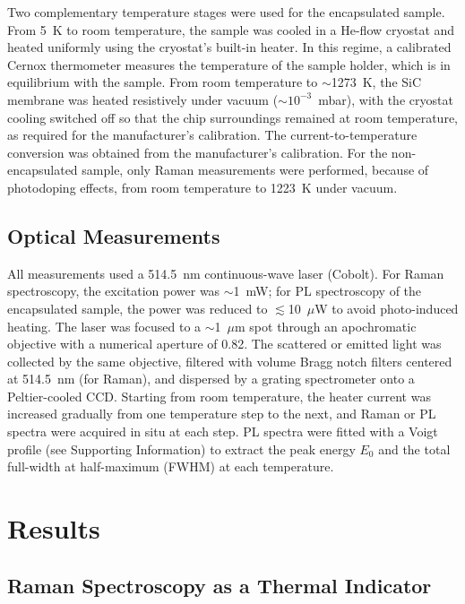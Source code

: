 \documentclass[letterpaper]{article}
\DeclareRobustCommand{\rev}[1]{#1}
\begin{document}
Two complementary temperature stages were used for the encapsulated sample.
From 5~K to room temperature, the sample was cooled in a He-flow cryostat and
heated uniformly using the cryostat's built-in heater. In this regime, \rev{a
calibrated Cernox thermometer measures the temperature of the sample holder},
which is in equilibrium with the sample. From room temperature to $\sim$1273~K, the
SiC membrane was heated resistively under vacuum ($\sim$$10^{-3}$~mbar), \rev{with
the cryostat cooling switched off so that the chip surroundings remained at room
temperature, as required for the manufacturer's calibration}. The current-to-temperature
conversion was obtained from the manufacturer's calibration. For the
non-encapsulated sample, \rev{only Raman measurements were performed, because of
photodoping effects, from room temperature to 1223~K under vacuum}.

\subsection{Optical Measurements}

All measurements used a 514.5~nm continuous-wave laser (Cobolt). For Raman
spectroscopy, the excitation power was $\sim$1~mW; for PL spectroscopy of the
encapsulated sample, the power was reduced to $\lesssim$10~$\mu$W to avoid
photo-induced heating. The laser was focused to a $\sim$1~$\mu$m spot through \rev{an
apochromatic objective with a numerical aperture of 0.82}. The scattered or emitted light was
collected by the same objective, filtered with volume Bragg notch filters centered
at 514.5~nm (for Raman), and dispersed by a grating spectrometer onto a
Peltier-cooled CCD. \rev{Starting from room temperature, the heater current was
increased gradually from one temperature step to the next, and Raman or PL
spectra were acquired in situ at each step.} PL spectra were fitted with a \rev{Voigt}
profile (see Supporting Information) to extract the peak energy $E_0$ and the
total full-width at half-maximum (FWHM) at each temperature.

\section{Results}

\subsection{Raman Spectroscopy as a Thermal Indicator}
\end{document}
